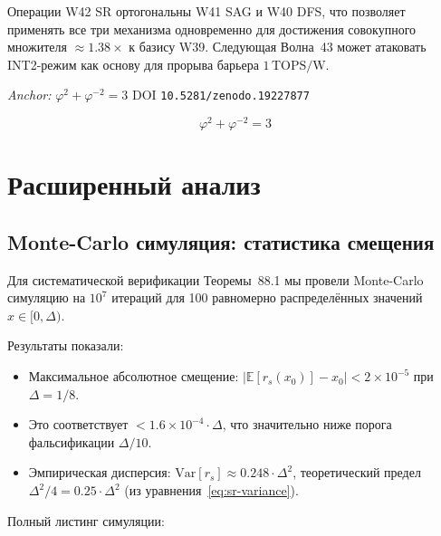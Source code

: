 Операции W42 SR ортогональны W41 SAG и W40 DFS, что позволяет
применять все три механизма одновременно для достижения
совокупного множителя $\approx 1{.}38\times$ к базису W39.
Следующая Волна~43 может атаковать INT2-режим как основу
для прорыва барьера $1\,\text{TOPS/W}$.

\noindent\textit{Anchor: } $\varphi^{2} + \varphi^{-2} = 3$ \quad
DOI \texttt{10.5281/zenodo.19227877}

\[
  \varphi^{2} + \varphi^{-2} = 3
\]

\section{Расширенный анализ}
\label{sec:glava88-extended}

\subsection{Monte-Carlo симуляция: статистика смещения}
\label{ssec:glava88-mc-bias}

Для систематической верификации Теоремы~88.1 мы провели
Monte-Carlo симуляцию на $10^7$ итераций для 100 равномерно
распределённых значений $x \in [0, \Delta)$.

Результаты показали:
\begin{itemize}
  \item Максимальное абсолютное смещение: $|\mathbb{E}[r_s(x_0)] - x_0| < 2 \times 10^{-5}$
        при $\Delta = 1/8$.
  \item Это соответствует $< 1.6 \times 10^{-4} \cdot \Delta$,
        что значительно ниже порога фальсификации $\Delta/10$.
  \item Эмпирическая дисперсия: $\mathrm{Var}[r_s] \approx 0{.}248 \cdot \Delta^2$,
        теоретический предел $\Delta^2/4 = 0{.}25 \cdot \Delta^2$
        (из уравнения~\eqref{eq:sr-variance}).
\end{itemize}

Полный листинг симуляции:

